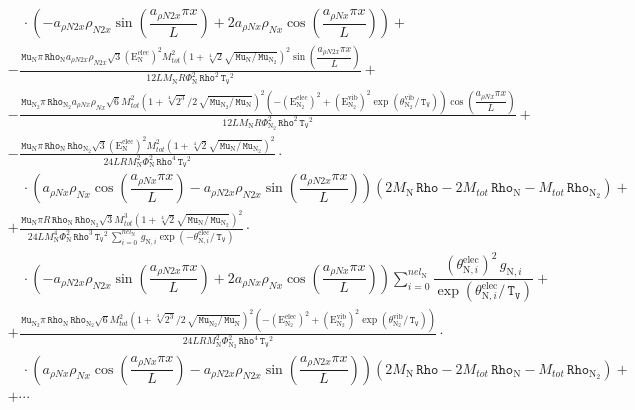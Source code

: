 \documentclass[10pt]{article}
\newcommand{\Rho}{\,\mathtt{Rho}}
\newcommand{\TV}{\,\mathtt{T_V}}
\newcommand{\N}{\text{N}}
\newcommand{\elec}{\text{elec}}
\newcommand{\vib}{\text{vib}}
\newcommand{\E}{\text{E}}
\newcommand{\Mu}{\, \mathtt{Mu}}
\newcommand{\eelecNden}{\,\sum_{i=0}^{nel_{\N}}   \, g_{\N,i}   \exp \left( -\theta^{\elec}_{\N,i} / \TV  \right) }
\begin{document}
\begin{equation*}
\begin{split}
 &\quad \cdot\left(- a_{\rho N2 x} \rho_{N2 x} \sin\left(\dfrac{a_{\rho N2 x} \pi x}{L}\right) + 2 a_{\rho N x} \rho_{N x}
\cos\left(\dfrac{a_{\rho N x} \pi x}{L}\right)\right) +\\ 
%
&- \frac{\Mu_{\N} \pi \Rho_{\N} a_{\rho N2 x} \rho_{N2 x} \sqrt{3} \left( \E^{\elec}_{\N} \right)^2 M_{tot}^{2} \left(1 +
\sqrt[4]{2} \sqrt{ \Mu_{\N} / \Mu_{\N_2} }\right)^{2} \sin\left(\dfrac{a_{\rho N2 x} \pi x}{L}\right)}{12 L M_{\N} R \Phi_{\N}^{2}
\Rho^{2} \TV^{2}} +\\ 
%
&- \frac{\Mu_{\N_2} \pi \Rho_{\N_2} a_{\rho N x} \rho_{N x} \sqrt{6} M_{tot}^{2} \left(1 + \sqrt[4]{2^3} / 2 \, \sqrt{ \Mu_{\N_2}
/ \Mu_{\N} }\right)^{2} \left(- \left( \E^{\elec}_{\N_2} \right)^2 + \left( \E^{\vib}_{\N_2} \right)^2 \exp\left(
\theta^{\vib}_{\N_2} / \TV \right) \right) \cos\left(\dfrac{a_{\rho N x} \pi x}{L}\right)}{12 L M_{\N} R \Phi_{\N_2}^{2} \Rho^{2}
\TV^{2}} +\\ 
%
&- \frac{\Mu_{\N} \pi \Rho_{\N} \Rho_{\N_2} \sqrt{3} \left( \E^{\elec}_{\N} \right)^2 M_{tot}^{2} \left(1 + \sqrt[4]{2} \sqrt{
\Mu_{\N} / \Mu_{\N_2} }\right)^{2}}{24 L R M_{\N}^{2} \Phi_{\N}^{2} \Rho^{4} \TV^{2}} \cdot\\
 &\quad \cdot\left(a_{\rho N x} \rho_{N x} \cos\left(\dfrac{a_{\rho N x} \pi x}{L}\right) - a_{\rho N2 x} \rho_{N2 x}
\sin\left(\dfrac{a_{\rho N2 x} \pi x}{L}\right)\right) \left(2 M_{\N} \Rho - 2 M_{tot} \Rho_{\N} - M_{tot} \Rho_{\N_2}\right) +\\ 
%
&+ \frac{\Mu_{\N} \pi R \Rho_{\N} \Rho_{\N_2} \sqrt{3} M_{tot}^{3} \left(1 + \sqrt[4]{2} \sqrt{ \Mu_{\N} / \Mu_{\N_2} }\right)^{2}
}{24 L M_{\N}^{4} \Phi_{\N}^{2} \Rho^{3} \TV^{2} \eelecNden } \cdot\\
 &\quad \cdot\left(- a_{\rho N2 x} \rho_{N2 x} \sin\left(\dfrac{a_{\rho N2 x} \pi x}{L}\right) + 2 a_{\rho N x} \rho_{N x}
\cos\left(\dfrac{a_{\rho N x} \pi x}{L}\right)\right) \sum_{i=0}^{nel_{\N}} \dfrac{ \left( \theta^{\elec}_{\N,i} \right)^2   \,
g_{\N,i} }{ \exp \left( \theta^{\elec}_{\N,i} / \TV \right)}+\\ 
%
&+ \frac{\Mu_{\N_2} \pi \Rho_{\N} \Rho_{\N_2} \sqrt{6} M_{tot}^{2} \left(1 + \sqrt[4]{2^3} / 2 \, \sqrt{ \Mu_{\N_2} / \Mu_{\N}
}\right)^{2} \left(- \left( \E^{\elec}_{\N_2} \right)^2 + \left( \E^{\vib}_{\N_2} \right)^2 \exp\left( \theta^{\vib}_{\N_2} / \TV
\right) \right)}{24 L R M_{\N}^{2} \Phi_{\N_2}^{2} \Rho^{4} \TV^{2}} \cdot\\
 &\quad \cdot\left(a_{\rho N x} \rho_{N x} \cos\left(\dfrac{a_{\rho N x} \pi x}{L}\right) - a_{\rho N2 x} \rho_{N2 x}
\sin\left(\dfrac{a_{\rho N2 x} \pi x}{L}\right)\right) \left(2 M_{\N} \Rho - 2 M_{tot} \Rho_{\N} - M_{tot} \Rho_{\N_2}\right) +\\ 
%
%
&+\cdots \\
\end{split}
\end{equation*}
\end{document}
